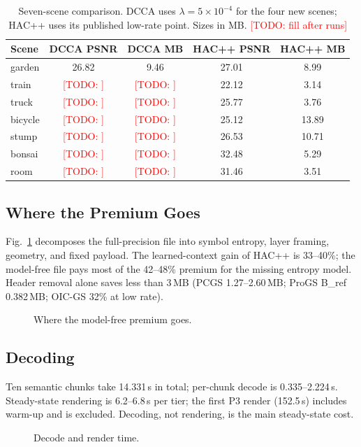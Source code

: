 \documentclass[conference]{IEEEtran}
\newcommand{\todo}[1]{\textcolor{red}{[TODO: #1]}}
\begin{document}
\begin{table}[t]
\centering
\caption{Seven-scene comparison. DCCA uses $\lambda=5\times10^{-4}$ for the four new scenes; HAC++ uses its published low-rate point. Sizes in MB. \todo{fill after runs}}
\label{tab:main}
\begin{tabular}{lcccc}
\toprule
Scene & DCCA PSNR & DCCA MB & HAC++ PSNR & HAC++ MB \\
\midrule
garden & 26.82 & 9.46 & 27.01 & 8.99 \\
train  & \todo{} & \todo{} & 22.12 & 3.14 \\
truck  & \todo{} & \todo{} & 25.77 & 3.76 \\
bicycle& \todo{} & \todo{} & 25.12 & 13.89 \\
stump  & \todo{} & \todo{} & 26.53 & 10.71 \\
bonsai & \todo{} & \todo{} & 32.48 & 5.29 \\
room   & \todo{} & \todo{} & 31.46 & 3.51 \\
\bottomrule
\end{tabular}
\end{table}

\subsection{Where the Premium Goes}
Fig.~\ref{fig:premium} decomposes the full-precision file into symbol entropy, layer framing, geometry, and fixed payload. The learned-context gain of HAC++ is 33--40\%; the model-free file pays most of the 42--48\% premium for the missing entropy model. Header removal alone saves less than 3\,MB (PCGS 1.27--2.60\,MB; ProGS B\_ref 0.382\,MB; OIC-GS 32\% at low rate).

\begin{figure}[t]
\centering
{}
\caption{Where the model-free premium goes.}
\label{fig:premium}
\end{figure}

\subsection{Decoding}
Ten semantic chunks take 14.331\,s in total; per-chunk decode is 0.335--2.224\,s. Steady-state rendering is 6.2--6.8\,s per tier; the first P3 render (152.5\,s) includes warm-up and is excluded. Decoding, not rendering, is the main steady-state cost.

\begin{figure}[t]
\centering
{}
\caption{Decode and render time.}
\label{fig:decode}
\end{figure}
\end{document}
